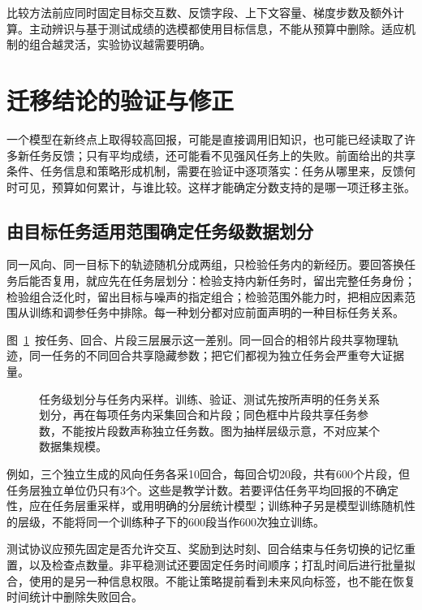 比较方法前应同时固定目标交互数、反馈字段、上下文容量、梯度步数及额外计算。主动辨识与基于测试成绩的选模都使用目标信息，不能从预算中删除。适应机制的组合越灵活，实验协议越需要明确。

\section{迁移结论的验证与修正}
\label{sec:rl-transfer-validation}

一个模型在新终点上取得较高回报，可能是直接调用旧知识，也可能已经读取了许多新任务反馈；只有平均成绩，还可能看不见强风任务上的失败。前面给出的共享条件、任务信息和策略形成机制，需要在验证中逐项落实：任务从哪里来，反馈何时可见，预算如何累计，与谁比较。这样才能确定分数支持的是哪一项迁移主张。

\subsection{由目标任务适用范围确定任务级数据划分}
\label{sec:rl-transfer-split}

同一风向、同一目标下的轨迹随机分成两组，只检验任务内的新经历。要回答换任务后能否复用，就应先在任务层划分：检验支持内新任务时，留出完整任务身份；检验组合泛化时，留出目标与噪声的指定组合；检验范围外能力时，把相应因素范围从训练和调参任务中排除。每一种划分都对应前面声明的一种目标任务关系。

图~\ref{fig:rl-transfer-split}~按任务、回合、片段三层展示这一差别。同一回合的相邻片段共享物理轨迹，同一任务的不同回合共享隐藏参数；把它们都视为独立任务会严重夸大证据量。

\begin{figure}[htbp]
 \centering
 
 \caption{任务级划分与任务内采样。训练、验证、测试先按所声明的任务关系划分，再在每项任务内采集回合和片段；同色框中片段共享任务参数，不能按片段数声称独立任务数。图为抽样层级示意，不对应某个数据集规模。}
 \label{fig:rl-transfer-split}
\end{figure}

例如，三个独立生成的风向任务各采10回合，每回合切20段，共有600个片段，但任务层独立单位仍只有3个。这些是教学计数。若要评估任务平均回报的不确定性，应在任务层重采样，或用明确的分层统计模型；训练种子另是模型训练随机性的层级，不能将同一个训练种子下的600段当作600次独立训练。

测试协议应预先固定是否允许交互、奖励到达时刻、回合结束与任务切换的记忆重置，以及检查点数量。非平稳测试还要固定任务时间顺序；打乱时间后进行批量拟合，使用的是另一种信息权限。不能让策略提前看到未来风向标签，也不能在恢复时间统计中删除失败回合。

